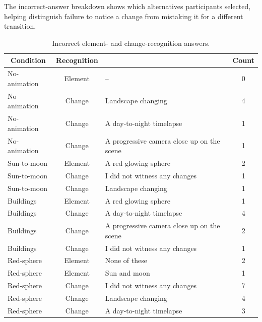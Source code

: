 \documentclass[
english,                 %
bibtex,                  %
includeExtraAbstracts, %
]{kththesis}
\newenvironment{evidenceblock}{\par\addvspace{6pt}\noindent\begin{minipage}{\linewidth}}{\end{minipage}\par\addvspace{6pt}}
\numberwithin{listing}{chapter}
\begin{document}
\begin{evidenceblock}
\normalsize
The incorrect-answer breakdown shows which alternatives participants selected, helping distinguish failure to notice a change from mistaking it for a different transition.

\begin{table}[H]
\centering
\footnotesize
\caption[Incorrect element- and change-recognition answers]{Incorrect element- and change-recognition answers.}
\label{tab:rq2-incorrect-answers}
\setlength{\tabcolsep}{3pt}
\renewcommand{\arraystretch}{1.18}
\begin{tabularx}{\textwidth}{@{}l c >{\raggedright\arraybackslash}X c@{}}
\toprule
\multicolumn{1}{c}{Condition} & Recognition & \multicolumn{1}{c}{Answer selected} & Count \\
\midrule
No-animation & Element & -- & 0 \\
No-animation & Change & Landscape changing & 4 \\
No-animation & Change & A day-to-night timelapse & 1 \\
No-animation & Change & A progressive camera close up on the scene & 1 \\
\midrule
Sun-to-moon & Element & A red glowing sphere & 2 \\
Sun-to-moon & Change & I did not witness any changes & 1 \\
Sun-to-moon & Change & Landscape changing & 1 \\
\midrule
Buildings & Element & A red glowing sphere & 1 \\
Buildings & Change & A day-to-night timelapse & 4 \\
Buildings & Change & A progressive camera close up on the scene & 2 \\
Buildings & Change & I did not witness any changes & 1 \\
\midrule
Red-sphere & Element & None of these & 2 \\
Red-sphere & Element & Sun and moon & 1 \\
Red-sphere & Change & I did not witness any changes & 7 \\
Red-sphere & Change & Landscape changing & 4 \\
Red-sphere & Change & A day-to-night timelapse & 3 \\
\bottomrule
\end{tabularx}

\end{table}
\end{evidenceblock}






\iftoggle{biblatex}{
    \printbibliography
}{
    
}
\end{document}
